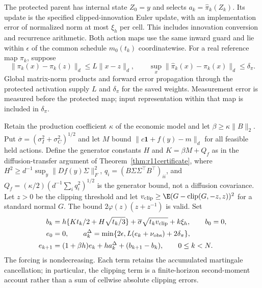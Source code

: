The protected parent has internal state $Z_0=y$ and selects
$a_k=\widehat\pi_k(Z_k)$. Its update is the specified clipped-innovation
Euler update, with an implementation error of normalized norm at most
$\xi_h$ per cell. This includes innovation conversion and recurrence
arithmetic. Both action maps use the same inward guard and lie within
$\epsilon$ of the common schedule $m_0(t_k)$ coordinatewise.
For a real reference map $\pi_k$, suppose
\[
 \|\pi_k(x)-\pi_k(z)\|_d\leq L\|x-z\|_d,
 \qquad \sup_x\|\widehat\pi_k(x)-\pi_k(x)\|_d\leq\delta_\pi.
\]
Global matrix-norm products and forward error propagation through the
protected activation supply $L$ and $\delta_\pi$ for the saved weights.
Measurement error is measured before the protected map; input
representation within that map is included in $\delta_\pi$.

Retain the production coefficient $\kappa$ of the economic model and
let $\beta\geq\kappa\|B\|_2$. Put
$\overline\sigma=(\sigma_I^2+\sigma_C^2)^{1/2}$ and let $M$ bound
$\|c\bm1+f(y)-m\|_d$ for all feasible held actions. Define the
generator constants $H$ and $K=\beta M+Q_f$ as in the diffusion-transfer argument of Theorem~\ref{thm:r11certificate},
where $H^2\geq d^{-1}\sup_y\|Df(y)\Sigma\|_F^2$, $q_i=(B\Sigma\Sigma^\top B^\top)_{ii}$, and $Q_f=(\kappa/2)(d^{-1}\sum_iq_i^2)^{1/2}$ is the generator
bound, not a diffusion covariance. Let $z>0$ be the clipping threshold and let
$v_{\rm clip}\geq\E(G-\operatorname{clip}(G,-z,z))^2$ for a standard normal
$G$. The bound $2\varphi(z)(z+z^{-1})$ is valid.
Set
\begin{align}
 b_k&=h\{Kt_k/2+H\sqrt{t_k/3}\}
          +\overline\sigma\sqrt{t_kv_{\rm clip}}+k\xi_h,
          \qquad b_0=0,\label{eq:r14sensorforcing}\\
 e_0&=0,\qquad
 a_k^\Delta=\min\{2\epsilon,L(e_k+\nu_{\rm obs})+2\delta_\pi\},\notag\\
 e_{k+1}&=(1+\beta h)e_k+h a_k^\Delta+(b_{k+1}-b_k),
       \qquad 0\leq k<N.\label{eq:r14sensorrecursion}
\end{align}
The forcing is nondecreasing. Each term retains the accumulated
martingale cancellation; in particular, the clipping term is a
finite-horizon second-moment account rather than a sum of cellwise
absolute clipping errors.

